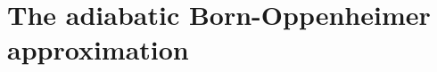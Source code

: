 
\chapter{The adiabatic Born-Oppenheimer approximation} %

\label{Chapter1} %


\newcommand{\keyword}[1]{\textbf{#1}}
\newcommand{\tabhead}[1]{\textbf{#1}}
\newcommand{\code}[1]{\texttt{#1}}
\newcommand{\file}[1]{\texttt{\bfseries#1}}
\newcommand{\option}[1]{\texttt{\itshape#1}}


